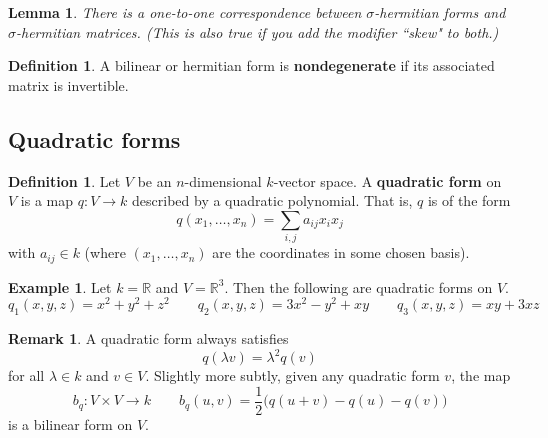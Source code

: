 \documentclass[12pt]{article}
\newtheorem{lemma}[theorem]{Lemma}
\theoremstyle{definition}
\newtheorem{definition}[theorem]{Definition}
\newtheorem{example}[theorem]{Example}
\newtheorem{remark}[theorem]{Remark}
\newcommand{\R}{\mathbb{R}}
\newcommand{\sig}{\sigma}
\newcommand{\lam}{\lambda}
\newcommand{\tbf}{\textbf}
\begin{document}
\begin{lemma}
There is a one-to-one correspondence between $\sig$-hermitian forms and $\sig$-hermitian matrices. (This is also true if you add the modifier ``skew" to both.)
\end{lemma}

\begin{definition}
A bilinear or hermitian form is \tbf{nondegenerate} if its associated matrix is invertible.
\end{definition}

\subsection{Quadratic forms}

\begin{definition}
Let $V$ be an $n$-dimensional $k$-vector space. A \tbf{quadratic form} on $V$ is a map $q:V \to k$ described by a quadratic polynomial. That is, $q$ is of the form
\[
	q( x_1, \ldots, x_n) = \sum_{i,j} a_{ij} x_i x_j
\]
with $a_{ij} \in k$ (where $(x_1, \ldots, x_n)$ are the coordinates in some chosen basis).
\end{definition}

\begin{example}
Let $k = \R$ and $V = \R^3$. Then the following are quadratic forms on $V$.
\[
	q_1(x,y,z) = x^2+y^2+z^2 \qquad q_2(x,y,z) = 3x^2 - y^2 + xy \qquad q_3(x,y,z) = xy + 3xz 
\]
\end{example}

\begin{remark}
A quadratic form always satisfies
\[
	q( \lam v) = \lam^2 q(v)
\]
for all $\lam \in k$ and $v \in V$. Slightly more subtly, given any quadratic form $v$, the map
\[
	b_q:V \times V \to k \qquad b_q(u,v) = \frac 12 \Big( q(u+v) - q(u) - q(v) \Big)
\]
is a bilinear form on $V$.
\end{remark}
\end{document}
